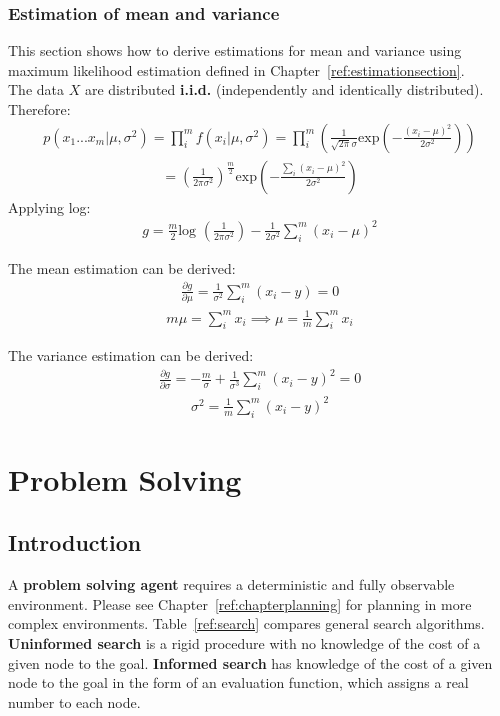 \documentclass{report}
\begin{document}
\subsection{Estimation of mean and variance}
This section shows how to derive estimations for mean and variance using maximum likelihood estimation defined in Chapter~\ref{ref:estimationsection}.\\

The data $X$ are distributed {\bf i.i.d.} (independently and identically distributed). Therefore:
\begin{align*}
p(x_1...x_m\vert \mu,\sigma^2)=\prod_i^m f(x_i\vert \mu,\sigma^2)=\prod_i^m (\frac{1}{\sqrt{2\pi}\sigma}\mbox{exp}(-\frac{(x_i-\mu)^2}{2\sigma^2}))
\end{align*}
\begin{align*}
=(\frac{1}{2\pi\sigma^2})^{\frac{m}{2}}\mbox{exp}(-\frac{\sum_i(x_i-\mu)^2}{2\sigma^2})
\end{align*}
Applying log:
\begin{align*}
g = \frac{m}{2}\mbox{log }(\frac{1}{2\pi\sigma^2})-\frac{1}{2\sigma^2}\sum_i^m(x_i-\mu)^2
\end{align*}

The mean estimation can be derived:
\begin{align*}
\frac{\partial g}{\partial \mu} = \frac{1}{\sigma^2}\sum_i^m (x_i - y) = 0
\end{align*}
\begin{align*}
m\mu = \sum_i^m x_i \implies \mu = \frac{1}{m}\sum_i^m x_i
\end{align*}

The variance estimation can be derived:
\begin{align*}
\frac{\partial g}{\partial \sigma} = -\frac{m}{\sigma}+\frac{1}{\sigma^3}\sum_i^m (x_i - y)^2 = 0
\end{align*}
\begin{align*}
\sigma^2 = \frac{1}{m}\sum_i^m (x_i - y)^2
\end{align*}



\chapter{Problem Solving}
\section{Introduction}
A {\bf problem solving agent} requires a deterministic and fully observable environment. Please see Chapter~\ref{ref:chapterplanning} for planning in more complex environments. Table~\ref{ref:search} compares general search algorithms. 
{\bf Uninformed search} is a rigid procedure with no knowledge of the cost of a given node to the goal.
{\bf Informed search} has knowledge of the cost of a given node to the goal in the form of an evaluation function, which assigns a real number to each node.
\end{document}
